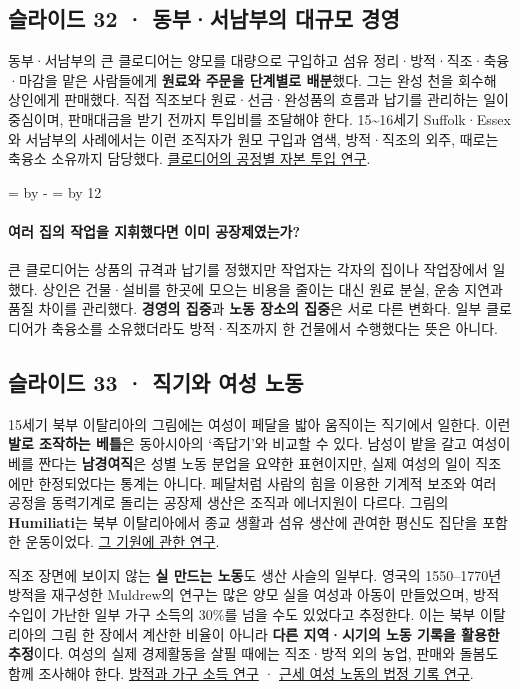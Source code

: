 \documentclass[10pt,a4paper]{article}
\newcommand{\ReserveQuestionSpace}{%
  \par\begingroup
  \dimen0=\pagegoal \advance\dimen0 by -\pagetotal
  \dimen2=\baselineskip \multiply\dimen2 by 12
  \ifdim\dimen0<\dimen2 \newpage\fi
  \endgroup}
\begin{document}
\subsection{슬라이드 32 · 동부·서남부의 대규모 경영}
동부·서남부의 큰 클로디어는 양모를 대량으로 구입하고 섬유 정리·방적·직조·축융·마감을 맡은 사람들에게 \textbf{원료와 주문을 단계별로 배분}했다. 그는 완성 천을 회수해 상인에게 판매했다. 직접 직조보다 원료·선금·완성품의 흐름과 납기를 관리하는 일이 중심이며, 판매대금을 받기 전까지 투입비를 조달해야 한다. 15\textasciitilde{}16세기 Suffolk·Essex와 서남부의 사례에서는 이런 조직자가 원모 구입과 염색, 방적·직조의 외주, 때로는 축융소 소유까지 담당했다. \href{https://www.cambridge.org/core/journals/rural-history/article/abs/clothiers-century-14501550/FEFB104D6FB9D0C265D7CE711BA79DBE}{클로디어의 공정별 자본 투입 연구}.\par

\ReserveQuestionSpace
\paragraph{여러 집의 작업을 지휘했다면 이미 공장제였는가?}
큰 클로디어는 상품의 규격과 납기를 정했지만 작업자는 각자의 집이나 작업장에서 일했다. 상인은 건물·설비를 한곳에 모으는 비용을 줄이는 대신 원료 분실, 운송 지연과 품질 차이를 관리했다. \textbf{경영의 집중}과 \textbf{노동 장소의 집중}은 서로 다른 변화다. 일부 클로디어가 축융소를 소유했더라도 방적·직조까지 한 건물에서 수행했다는 뜻은 아니다.\par

\subsection{슬라이드 33 · 직기와 여성 노동}
15세기 북부 이탈리아의 그림에는 여성이 페달을 밟아 움직이는 직기에서 일한다. 이런 \textbf{발로 조작하는 베틀}은 동아시아의 ‘족답기’와 비교할 수 있다. 남성이 밭을 갈고 여성이 베를 짠다는 \textbf{남경여직}은 성별 노동 분업을 요약한 표현이지만, 실제 여성의 일이 직조에만 한정되었다는 통계는 아니다. 페달처럼 사람의 힘을 이용한 기계적 보조와 여러 공정을 동력기계로 돌리는 공장제 생산은 조직과 에너지원이 다르다. 그림의 \textbf{Humiliati}는 북부 이탈리아에서 종교 생활과 섬유 생산에 관여한 평신도 집단을 포함한 운동이었다. \href{https://www.cambridge.org/core/journals/studies-in-church-history/article/abs/principium-et-origo-ordinis-the-humiliati-and-their-origins/0C989D0255F4E4AEC45975A1E5C8138A}{그 기원에 관한 연구}.\par

직조 장면에 보이지 않는 \textbf{실 만드는 노동}도 생산 사슬의 일부다. 영국의 1550–1770년 방적을 재구성한 Muldrew의 연구는 많은 양모 실을 여성과 아동이 만들었으며, 방적 수입이 가난한 일부 가구 소득의 30\%를 넘을 수도 있었다고 추정한다. 이는 북부 이탈리아의 그림 한 장에서 계산한 비율이 아니라 \textbf{다른 지역·시기의 노동 기록을 활용한 추정}이다. 여성의 실제 경제활동을 살필 때에는 직조·방적 외의 농업, 판매와 돌봄도 함께 조사해야 한다. \href{https://onlinelibrary.wiley.com/doi/10.1111/j.1468-0289.2010.00588.x}{방적과 가구 소득 연구} · \href{https://onlinelibrary.wiley.com/doi/10.1111/ehr.12821}{근세 여성 노동의 법정 기록 연구}.\par
\end{document}
